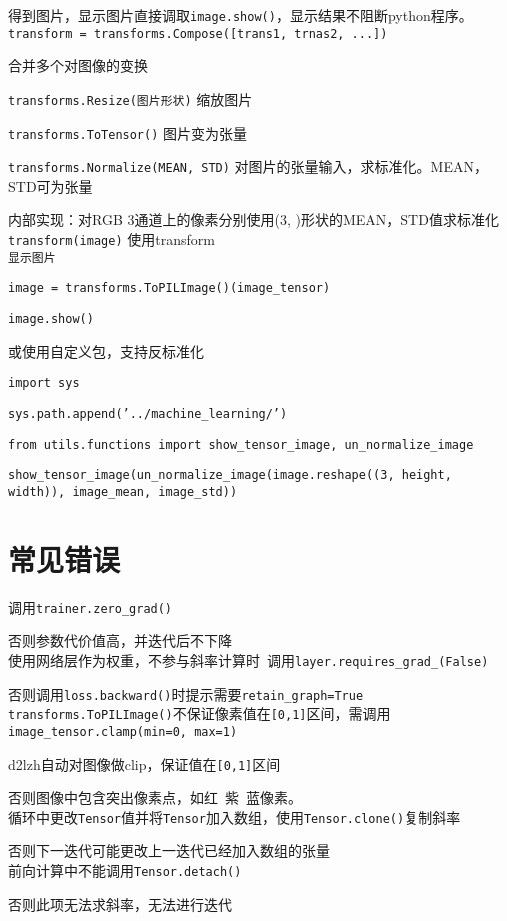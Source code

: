 \documentclass[UTF8]{ctexart}
\begin{document}
  得到图片，显示图片直接调取\texttt{image.show()}，显示结果不阻断python程序。\\
\texttt{transform = transforms.Compose([trans1, trnas2, ...])}

  合并多个对图像的变换

  \texttt{transforms.Resize(图片形状)} 缩放图片

  \texttt{transforms.ToTensor()} 图片变为张量

  \texttt{transforms.Normalize(MEAN, STD)} 对图片的张量输入，求标准化。MEAN，STD可为张量
  
  \quad 内部实现：对RGB 3通道上的像素分别使用(3, )形状的MEAN，STD值求标准化\\
\texttt{transform(image)} 使用transform\\
\texttt{显示图片}

  \texttt{image = transforms.ToPILImage()(image\_tensor)}

  \texttt{image.show()}
  
  \quad 或使用自定义包，支持反标准化

  \texttt{import sys}

  \texttt{sys.path.append('../machine\_learning/')}

  \texttt{from utils.functions import show\_tensor\_image, un\_normalize\_image}

  \texttt{show\_tensor\_image(un\_normalize\_image(image.reshape((3, height, width)), image\_mean, image\_std))}

\section{常见错误}
\noindent 调用\texttt{trainer.zero\_grad()}

  否则参数代价值高，并迭代后不下降\\
使用网络层作为权重，不参与斜率计算时\ 调用\texttt{layer.requires\_grad\_(False)}

  否则调用\texttt{loss.backward()}时提示需要\texttt{retain\_graph=True}\\
\texttt{transforms.ToPILImage()}不保证像素值在\texttt{[0,1]}区间，需调用\texttt{image\_tensor.clamp(min=0, max=1)}

  d2lzh自动对图像做clip，保证值在\texttt{[0,1]}区间
  
  否则图像中包含突出像素点，如红\ 紫\ 蓝像素。\\
循环中更改\texttt{Tensor}值并将\texttt{Tensor}加入数组，使用\texttt{Tensor.clone()}复制斜率

  否则下一迭代可能更改上一迭代已经加入数组的张量\\
前向计算中不能调用\texttt{Tensor.detach()}

  否则此项无法求斜率，无法进行迭代
\end{document}
